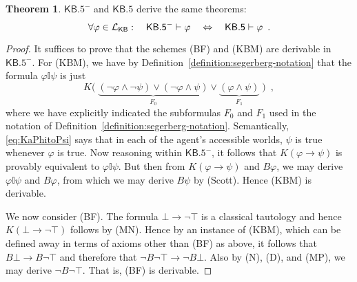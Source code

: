 \documentclass[12pt]{article}
\theoremstyle{definition}
\newtheorem{theorem}{Theorem}[section]
\newcommand{\Lang}{{\cal L}}   %
\newcommand{\KB}{{\mathsf{KB}}}                 %
\newcommand{\KBeq}{{\mathsf{KB.5}}}             %
\newcommand{\KBeqm}{{\mathsf{KB.5}}^{-}}        %
\begin{document}
\begin{theorem}
  \label{theorem:KBminus}
  $\KBeqm$ and $\KBeq$ derive the same theorems:
  \[
  \forall\varphi\in\Lang_\KB:\quad
  \KBeqm\vdash\varphi \quad\Leftrightarrow\quad \KBeq\vdash\varphi\enspace.
  \]
\end{theorem}
\begin{proof}
  It suffices to prove that the schemes (BF) and (KBM) are derivable
  in $\KBeqm$. For (KBM), we have by
  Definition~\ref{definition:segerberg-notation} that the formula
  $\varphi\mathbb{I}\psi$ is just
  \begin{equation}
    K\bigl(\;
    \underbrace{(\lnot\varphi\land\lnot\psi) \lor (\lnot\varphi\land\psi)}_{F_0} \lor
    \underbrace{(\varphi\land\psi)}_{F_1}
    \;\bigr)\enspace,
    \label{eq:KaPhitoPsi}
  \end{equation}
  where we have explicitly indicated the subformulas $F_0$ and $F_1$
  used in the notation of
  Definition~\ref{definition:segerberg-notation}.  Semantically,
  \eqref{eq:KaPhitoPsi} says that in each of the agent's accessible
  worlds, $\psi$ is true whenever $\varphi$ is true.  Now reasoning
  within $\KBeqm$, it follows that $K(\varphi\to\psi)$ is provably
  equivalent to $\varphi\mathbb{I}\psi$.  But then from $K(\varphi\to\psi)$
  and $B\varphi$, we may derive $\varphi\mathbb{I}\psi$ and $B\varphi$, from
  which we may derive $B\psi$ by (Scott). Hence (KBM) is derivable.

  We now consider (BF).  The formula $\bot\to\lnot\top$ is a classical
  tautology and hence $K(\bot\to\lnot\top)$ follows by (MN).  Hence
  by an instance of (KBM), which can be defined away in terms of
  axioms other than (BF) as above, it follows that $B\bot\to
  B\lnot\top$ and therefore that $\lnot B\lnot\top\to\lnot
  B\bot$.  Also by (N), (D), and (MP), we may derive $\lnot
  B\lnot\top$.  That is, (BF) is derivable.
\end{proof}
\end{document}
